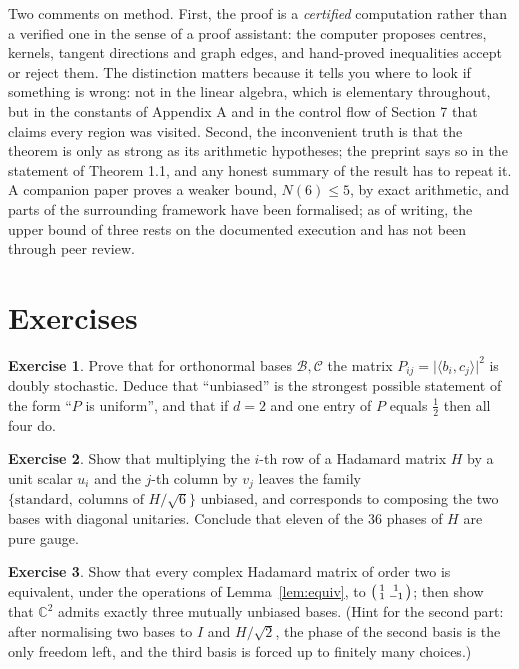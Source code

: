 \documentclass[11pt]{article}
\theoremstyle{definition}
\theoremstyle{plain}
\theoremstyle{definition}
\newtheorem{exercise}{Exercise}
\newcommand{\C}{\mathbb{C}}
\newcommand{\inner}[2]{\langle #1,#2\rangle}
\newcommand{\abs}[1]{\lvert #1\rvert}
\begin{document}
Two comments on method. First, the proof is a \emph{certified} computation rather than a verified one
in the sense of a proof assistant: the computer proposes centres, kernels, tangent directions and
graph edges, and hand-proved inequalities accept or reject them. The distinction matters because it
tells you where to look if something is wrong: not in the linear algebra, which is elementary
throughout, but in the constants of Appendix A and in the control flow of Section 7 that claims every
region was visited. Second, the inconvenient truth is that the theorem is only as strong as its
arithmetic hypotheses; the preprint says so in the statement of Theorem 1.1, and any honest summary of
the result has to repeat it. A companion paper proves a weaker bound, $N(6)\le 5$, by exact
arithmetic, and parts of the surrounding framework have been formalised; as of writing, the upper
bound of three rests on the documented execution and has not been through peer review.

\section{Exercises}

\begin{exercise}\label{ex:doubly}
Prove that for orthonormal bases $\mathcal B,\mathcal C$ the matrix $P_{ij}=\abs{\inner{b_i}{c_j}}^2$ is
doubly stochastic. Deduce that ``unbiased'' is the strongest possible statement of the form ``$P$ is
uniform'', and that if $d=2$ and one entry of $P$ equals $\tfrac12$ then all four do.
\end{exercise}

\begin{exercise}\label{ex:rephase}
Show that multiplying the $i$-th row of a Hadamard matrix $H$ by a unit scalar $u_i$ and the $j$-th
column by $v_j$ leaves the family $\{\text{standard},\ \text{columns of }H/\sqrt6\}$ unbiased, and
corresponds to composing the two bases with diagonal unitaries. Conclude that eleven of the $36$
phases of $H$ are pure gauge.
\end{exercise}

\begin{exercise}\label{ex:d2had}
Show that every complex Hadamard matrix of order two is equivalent, under the operations of
Lemma~\ref{lem:equiv}, to $\begin{psmallmatrix}1&1\\1&-1\end{psmallmatrix}$; then show that $\C^2$
admits exactly three mutually unbiased bases. (Hint for the second part: after normalising two bases
to $I$ and $H/\sqrt2$, the phase of the second basis is the only freedom left, and the third basis
is forced up to finitely many choices.)
\end{exercise}
\end{document}
